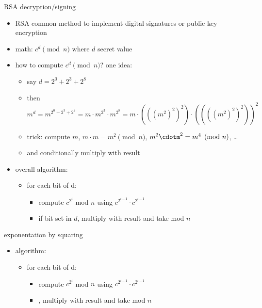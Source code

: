 \begin{frame}{RSA decryption/signing}
\begin{itemize}
\item RSA common method to implement digital signatures or public-key encryption
\item math: $c^d \pmod n$ where $d$ secret value
\item how to compute $c^d \pmod n$? one idea:
    \begin{itemize}
    \item say $d=2^0 + 2^3 + 2^8$
    \item then $m^d = m^{2^0 + 2^3 + 2^4} = m\cdot m^{2^3}\cdot m^{2^8} = m\cdot(((m^2)^2)^2)\cdot((((m^2)^2)^2))^2$
    \item trick: compute $m$, $m\cdot m = m^2 \pmod n$, $m^2\cdotm^2 = m^4 \pmod n$, \ldots
    \item and conditionally multiply with result
    \end{itemize}
\item overall algorithm:
    \begin{itemize}
    \item for each bit of d:
        \begin{itemize}
        \item compute $c^{2^i}$ mod $n$ using $c^{2^{i-1}} \cdot c^{2^{i-1}}$
        \item if bit set in $d$, multiply with result and take mod $n$
        \end{itemize}
    \end{itemize}
\end{itemize}
\end{frame}

\begin{frame}{exponentation by squaring}
\begin{itemize}
\item algorithm:
    \begin{itemize}
    \item for each bit of d:
        \begin{itemize}
        \item compute $c^{2^i}$ mod $n$ using $c^{2^{i-1}} \cdot c^{2^{i-1}}$
        \item {}, multiply with result and take mod $n$
        \end{itemize}
    \end{itemize}
\end{itemize}
\end{frame}

